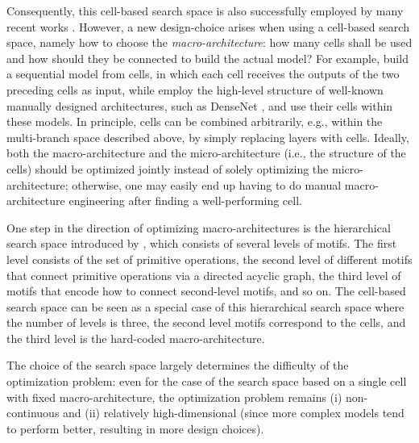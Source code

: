 \documentclass[twoside,11pt]{article}
\newcommand{\crc}[1]{#1}
\begin{document}
Consequently, this cell-based search space is also successfully employed by many recent works \citep{real_regularized_2018,liu_progressive_2017,pham_enas_2018,elsken_multi_2018,cai_path-level_2018, liu_darts,zhong2018blockqnn}. However, a new design-choice arises when using a cell-based search space, namely how to choose the \emph{macro-architecture}: how many cells shall be used and how should they be connected to build the actual model? For example, \citet{DBLP:journals/corr/ZophVSL17} build a sequential model from cells, in which each cell receives the outputs of the two preceding cells as input, while \citet{cai_path-level_2018} employ the high-level structure of well-known manually designed architectures, such as DenseNet \citep{huang_densely_2016}, and use their cells within these models. In principle, cells can be combined arbitrarily, e.g., within the multi-branch space described above, by simply replacing layers with cells. \crc{Ideally, both the macro-architecture and the micro-architecture (i.e., the structure of the cells) should be optimized jointly instead of solely optimizing the micro-architecture; otherwise, one may easily end up having to do manual macro-architecture engineering after finding a well-performing cell.%
}
One step in the direction of optimizing macro-architectures is the hierarchical search space introduced by \citet{liu_hierarchical_2017}, which consists of several levels of motifs. The first level consists of the set of primitive operations, the second level of different motifs that connect primitive operations via a directed acyclic graph, the third level of motifs that encode how to connect second-level motifs, and so on. The cell-based search space can be seen as a special case of this hierarchical search space where the number of levels is three, the second level motifs correspond to the cells, and the third level is the hard-coded macro-architecture.



The choice of the search space largely determines the difficulty of the optimization problem: even for the case of the search space based on a single cell with fixed macro-architecture, the optimization problem remains (i) non-continuous and (ii) relatively high-dimensional (since more complex models tend to perform better, resulting in more design choices). 

\end{document}
